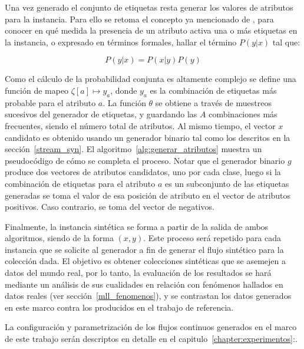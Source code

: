 Una vez generado el conjunto de etiquetas resta generar los valores de atributos
para la instancia. Para ello se retoma el concepto ya mencionado de
, para conocer en qué medida la presencia de
un atributo activa una o más etiquetas en la instancia, o expresado en términos
formales, hallar el término $P(y|x)$ tal que:

\begin{equation}
	P(y|x) = P(x|y)P(y)
\end{equation}

Como el cálculo de la probabilidad conjunta es altamente complejo se define una
función de mapeo $\zeta[a] \mapsto y_{a}$, donde $y_{a}$ es la combinación de
etiquetas más probable para el atributo $a$.  La función $\theta$ se obtiene a
través de muestreos sucesivos del generador de etiquetas, y guardando las $A$
combinaciones más frecuentes, siendo el número total de atributos. Al mismo
tiempo, el vector $x$ candidato es obtenido usando un generador binario tal como
los descritos en la sección~\ref{stream_syn}. El
algoritmo~\ref{alg:generar_atributos} muestra un pseudocódigo de cómo se
completa el proceso. Notar que el generador binario $g$ produce dos vectores de
atributos candidatos, uno por cada clase, luego si la combinación de etiquetas
para el atributo $a$ es un subconjunto de las etiquetas generadas se toma el
valor de esa posición de atributo en el vector de atributos positivos. Caso
contrario, se toma del vector de negativos.

Finalmente, la instancia sintética se forma a partir de la salida de ambos
algoritmos, siendo de la forma $(x, y)$. Este proceso será repetido para cada
instancia que se solicite al generador a fin de generar el flujo sintético para
la colección dada. El objetivo es obtener colecciones sintéticas que se asemejen
a datos del mundo real, por lo tanto, la evaluación de los resultados se hará
mediante un análisis de sus cualidades en relación con fenómenos hallados en
datos reales (ver sección~\ref{mll_fenomenos}), y se contrastan los datos
generados en este marco contra los producidos en el trabajo de referencia.

La configuración y parametrización de los flujos continuos generados en el marco
de este trabajo serán descriptos en detalle en el
capitulo~\ref{chapter:experimentos}:.

